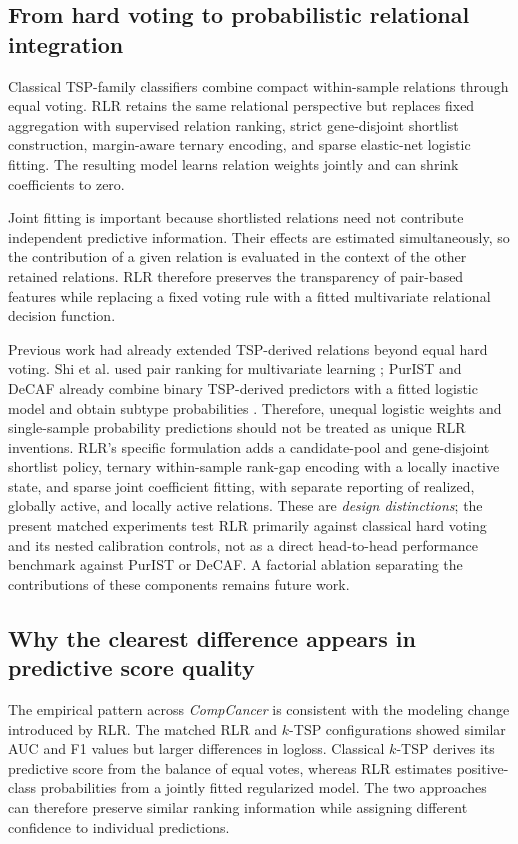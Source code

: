 \documentclass[preprint,12pt,a4paper]{elsarticle}
\begin{document}
\subsection{From hard voting to probabilistic relational integration}

Classical TSP-family classifiers combine compact within-sample relations through equal voting. RLR retains the same relational perspective but replaces fixed aggregation with supervised relation ranking, strict gene-disjoint shortlist construction, margin-aware ternary encoding, and sparse elastic-net logistic fitting. The resulting model learns relation weights jointly and can shrink coefficients to zero.

Joint fitting is important because shortlisted relations need not contribute independent predictive information. Their effects are estimated simultaneously, so the contribution of a given relation is evaluated in the context of the other retained relations. RLR therefore preserves the transparency of pair-based features while replacing a fixed voting rule with a fitted multivariate relational decision function.

Previous work had already extended TSP-derived relations beyond equal hard voting. Shi et al. used pair ranking for multivariate learning \cite{Shi2011TSPML}; PurIST and DeCAF already combine binary TSP-derived predictors with a fitted logistic model and obtain subtype probabilities \cite{Rashid2020PurIST,Peng2026DeCAF}. Therefore, unequal logistic weights and single-sample probability predictions should not be treated as unique RLR inventions. RLR's specific formulation adds a candidate-pool and gene-disjoint shortlist policy, ternary within-sample rank-gap encoding with a locally inactive state, and sparse joint coefficient fitting, with separate reporting of realized, globally active, and locally active relations. These are \emph{design distinctions}; the present matched experiments test RLR primarily against classical hard voting and its nested calibration controls, not as a direct head-to-head performance benchmark against PurIST or DeCAF. A factorial ablation separating the contributions of these components remains future work.

\subsection{Why the clearest difference appears in predictive score quality}

The empirical pattern across \emph{CompCancer} is consistent with the modeling change introduced by RLR. The matched RLR and $k$-TSP configurations showed similar AUC and F1 values but larger differences in logloss. Classical $k$-TSP derives its predictive score from the balance of equal votes, whereas RLR estimates positive-class probabilities from a jointly fitted regularized model. The two approaches can therefore preserve similar ranking information while assigning different confidence to individual predictions.
\end{document}
